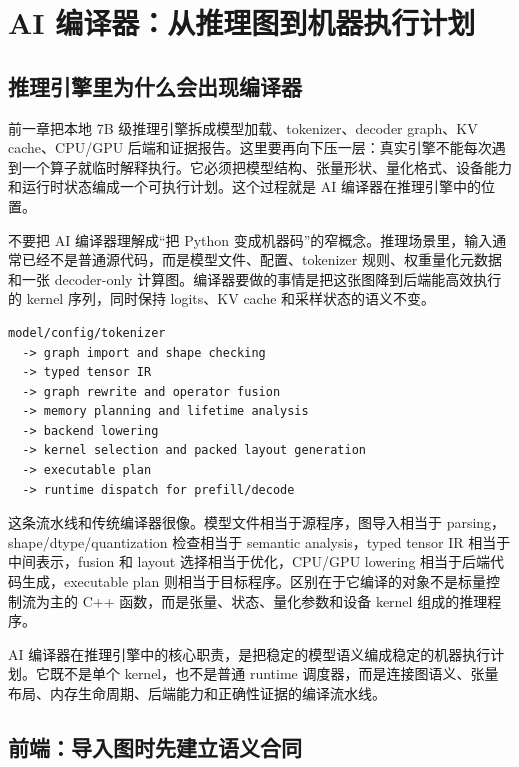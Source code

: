 \section{AI 编译器：从推理图到机器执行计划}

\subsection{推理引擎里为什么会出现编译器}

前一章把本地 7B 级推理引擎拆成模型加载、tokenizer、decoder graph、KV cache、CPU/GPU 后端和证据报告。这里要再向下压一层：真实引擎不能每次遇到一个算子就临时解释执行。它必须把模型结构、张量形状、量化格式、设备能力和运行时状态编成一个可执行计划。这个过程就是 AI 编译器在推理引擎中的位置。

不要把 AI 编译器理解成“把 Python 变成机器码”的窄概念。推理场景里，输入通常已经不是普通源代码，而是模型文件、配置、tokenizer 规则、权重量化元数据和一张 decoder-only 计算图。编译器要做的事情是把这张图降到后端能高效执行的 kernel 序列，同时保持 logits、KV cache 和采样状态的语义不变。

\begin{lstlisting}[numbers=none,caption={推理引擎中的 AI 编译流水线}]
model/config/tokenizer
  -> graph import and shape checking
  -> typed tensor IR
  -> graph rewrite and operator fusion
  -> memory planning and lifetime analysis
  -> backend lowering
  -> kernel selection and packed layout generation
  -> executable plan
  -> runtime dispatch for prefill/decode
\end{lstlisting}

这条流水线和传统编译器很像。模型文件相当于源程序，图导入相当于 parsing，shape/dtype/quantization 检查相当于 semantic analysis，typed tensor IR 相当于中间表示，fusion 和 layout 选择相当于优化，CPU/GPU lowering 相当于后端代码生成，executable plan 则相当于目标程序。区别在于它编译的对象不是标量控制流为主的 C++ 函数，而是张量、状态、量化参数和设备 kernel 组成的推理程序。

\begin{keyidea}
AI 编译器在推理引擎中的核心职责，是把稳定的模型语义编成稳定的机器执行计划。它既不是单个 kernel，也不是普通 runtime 调度器，而是连接图语义、张量布局、内存生命周期、后端能力和正确性证据的编译流水线。
\end{keyidea}

\subsection{前端：导入图时先建立语义合同}

